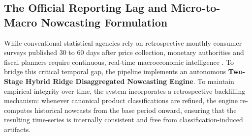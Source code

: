 \subsection{The Official Reporting Lag and Micro-to-Macro Nowcasting Formulation}
\hs While conventional statistical agencies rely on retrospective monthly consumer surveys published 30 to 60 days after price collection, monetary authorities and fiscal planners require continuous, real-time macroeconomic intelligence \citep{cavallo2016billion, macias2023nowcasting}. To bridge this critical temporal gap, the pipeline implements an autonomous \textbf{Two-Stage Hybrid Ridge Disaggregated Nowcasting Engine}. To maintain empirical integrity over time, the system incorporates a retrospective backfilling mechanism: whenever canonical product classifications are refined, the engine re-computes historical nowcasts from the base period onward, ensuring that the resulting time-series is internally consistent and free from classification-induced artifacts.

